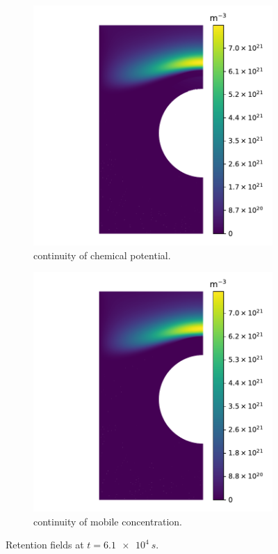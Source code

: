\begin{figure}
    \centering
    \begin{subfigure}{0.5\linewidth}
        \includegraphics[width=\linewidth]{Figures/Chapter3/monoblocks/interface_condition/retention_chemical_pot_short_exposure.pdf}
        \caption{continuity of chemical potential.}
    \end{subfigure}%
    \begin{subfigure}{0.5\linewidth}
        \includegraphics[width=\linewidth]{Figures/Chapter3/monoblocks/interface_condition/retention_concentration_short_exposure.pdf}
        \caption{continuity of mobile concentration.}
    \end{subfigure}
    \caption{Retention fields at $t=\SI{6.1e4}{s}$.}
\end{figure}

